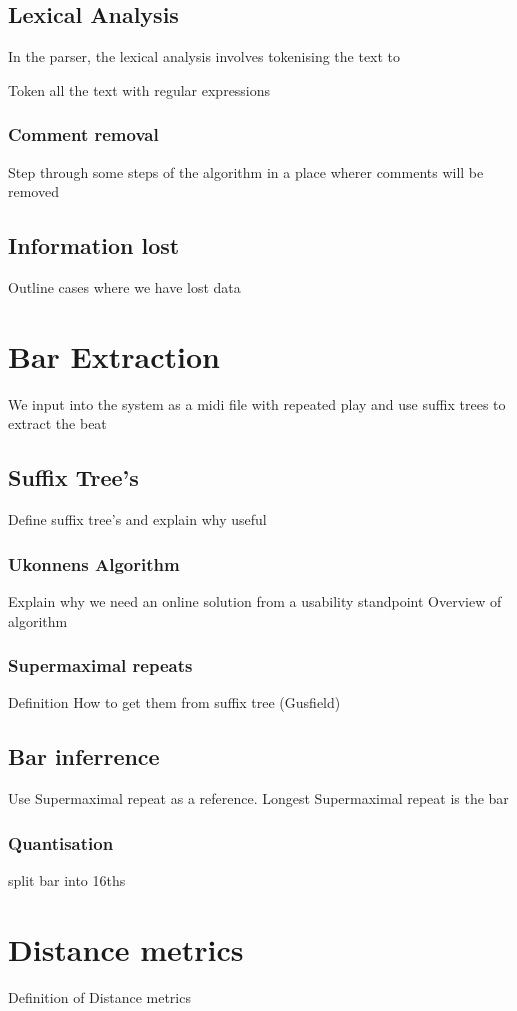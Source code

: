 \documentclass[12pt,twoside,notitlepage]{report}
\begin{document}
		\subsection{Lexical Analysis}
		In the parser, the lexical analysis involves tokenising the text to 
		
		Token all the text with regular expressions
			\subsubsection{Comment removal}
			Step through some steps of the algorithm in a place wherer comments will be removed
		\subsection{Information lost}
		Outline cases where we have lost data
	\section{Bar Extraction}
	We input into the system as a midi file with repeated play and use suffix trees to extract the beat
		\subsection{\label{subsec:SuffixTree}Suffix Tree's}
		Define suffix tree's and explain why useful
			\subsubsection{\label{subsubsec:Ukonnens}Ukonnens Algorithm}
			Explain why we need an online solution from a usability standpoint
			Overview of algorithm
			\subsubsection{Supermaximal repeats}
			Definition
			How to get them from suffix tree (Gusfield)
			
		\subsection{Bar inferrence}
		Use Supermaximal repeat as a reference.
		Longest Supermaximal repeat is the bar
			\subsubsection{Quantisation}
			split bar into 16ths
	\section{Distance metrics}
	Definition of Distance metrics
\end{document}
